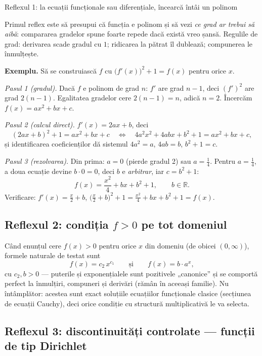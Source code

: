 \begin{tehbox}{Reflexul 1: la ecuații funcționale sau diferențiale, încearcă întâi un polinom}

Primul reflex este să presupui că funcția e polinom și să vezi \emph{ce grad ar trebui să aibă}: compararea gradelor spune foarte repede dacă există vreo șansă. Regulile de grad: derivarea scade gradul cu $1$; ridicarea la pătrat îl dublează; compunerea le înmulțește.

\textbf{Exemplu.} Să se construiască $f$ cu $\big(f'(x)\big)^2+1=f(x)$ pentru orice $x$.

\emph{Pasul 1 (gradul).} Dacă $f$ e polinom de grad $n$: $f'$ are grad $n-1$, deci $(f')^2$ are grad $2(n-1)$. Egalitatea gradelor cere $2(n-1)=n$, adică $n=2$. Încercăm $f(x)=ax^2+bx+c$.

\emph{Pasul 2 (calcul direct).} $f'(x)=2ax+b$, deci
\[
(2ax+b)^2+1=ax^2+bx+c
\quad\Longleftrightarrow\quad
4a^2x^2+4abx+b^2+1=ax^2+bx+c,
\]
și identificarea coeficienților dă sistemul $4a^2=a$, $4ab=b$, $b^2+1=c$.

\emph{Pasul 3 (rezolvarea).} Din prima: $a=0$ (pierde gradul 2) sau $a=\frac14$. Pentru $a=\frac14$, a doua ecuație devine $b\cdot0=0$, deci $b$ e \emph{arbitrar}, iar $c=b^2+1$:
\[
\boxed{\ f(x)=\frac{x^2}{4}+bx+b^2+1,\qquad b\in\mathbb{R}.\ }
\]
Verificare: $f'(x)=\frac x2+b$, $\big(\frac x2+b\big)^2+1=\frac{x^2}4+bx+b^2+1=f(x)$. \checkmark

\end{tehbox}

\subsection{Reflexul 2: condiția $f>0$ pe tot domeniul}

Când enunțul cere $f(x)>0$ pentru orice $x$ din domeniu (de obicei $(0,\infty)$), formele naturale de testat sunt
\[
f(x)=c_2\,x^{c_1}\qquad\text{și}\qquad f(x)=b\cdot a^{x},
\]
cu $c_2,b>0$ --- puterile și exponențialele sunt pozitivele „canonice'' și se comportă perfect la înmulțiri, compuneri și derivări (rămân în aceeași familie). Nu întâmplător: acestea sunt exact soluțiile ecuațiilor funcționale clasice (secțiunea de ecuații Cauchy), deci orice condiție cu structură multiplicativă le va selecta.

\subsection{Reflexul 3: discontinuități controlate --- funcții de tip Dirichlet}

